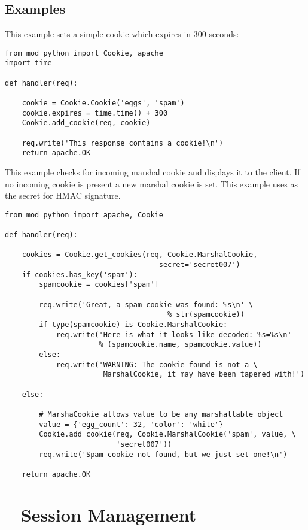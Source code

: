 \subsection{Examples\label{pyapi-cookie-example}}

This example sets a simple cookie which expires in 300 seconds:

\begin{verbatim}
from mod_python import Cookie, apache
import time

def handler(req):

    cookie = Cookie.Cookie('eggs', 'spam')
    cookie.expires = time.time() + 300
    Cookie.add_cookie(req, cookie)

    req.write('This response contains a cookie!\n')
    return apache.OK

\end{verbatim}

This example checks for incoming marshal cookie and displays it to the
client. If no incoming cookie is present a new marshal cookie is set.
This example uses  as the secret for HMAC signature.

\begin{verbatim}
from mod_python import apache, Cookie

def handler(req):
    
    cookies = Cookie.get_cookies(req, Cookie.MarshalCookie,
                                    secret='secret007')
    if cookies.has_key('spam'):
        spamcookie = cookies['spam']

        req.write('Great, a spam cookie was found: %s\n' \
                                      % str(spamcookie))
        if type(spamcookie) is Cookie.MarshalCookie:
            req.write('Here is what it looks like decoded: %s=%s\n'
                      % (spamcookie.name, spamcookie.value))
        else:
            req.write('WARNING: The cookie found is not a \
                       MarshalCookie, it may have been tapered with!')

    else:

        # MarshaCookie allows value to be any marshallable object
        value = {'egg_count': 32, 'color': 'white'}
        Cookie.add_cookie(req, Cookie.MarshalCookie('spam', value, \
                          'secret007'))
        req.write('Spam cookie not found, but we just set one!\n')

    return apache.OK
\end{verbatim}

\section{ -- Session Management\label{pyapi-sess}}
\modulesynopsis{Session Management}

